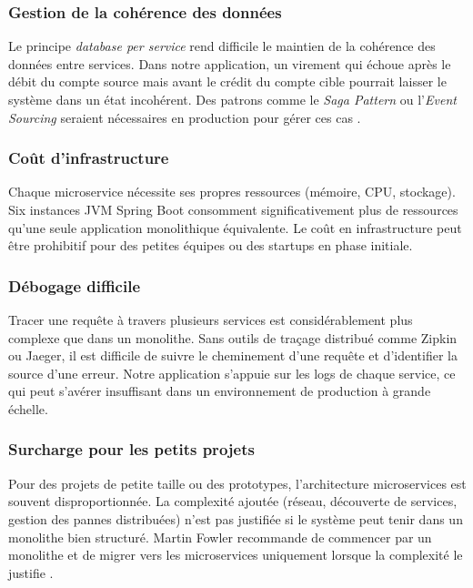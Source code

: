 \documentclass[12pt,a4paper]{article}
\begin{document}
\subsubsection{Gestion de la cohérence des données}

Le principe \textit{database per service} rend difficile le maintien de la cohérence des données entre services. Dans notre application, un virement qui échoue après le débit du compte source mais avant le crédit du compte cible pourrait laisser le système dans un état incohérent. Des patrons comme le \textit{Saga Pattern} ou l'\textit{Event Sourcing} seraient nécessaires en production pour gérer ces cas \cite{richardson2018}.

\subsubsection{Coût d'infrastructure}

Chaque microservice nécessite ses propres ressources (mémoire, CPU, stockage). Six instances JVM Spring Boot consomment significativement plus de ressources qu'une seule application monolithique équivalente. Le coût en infrastructure peut être prohibitif pour des petites équipes ou des startups en phase initiale.

\subsubsection{Débogage difficile}

Tracer une requête à travers plusieurs services est considérablement plus complexe que dans un monolithe. Sans outils de traçage distribué comme Zipkin ou Jaeger, il est difficile de suivre le cheminement d'une requête et d'identifier la source d'une erreur. Notre application s'appuie sur les logs de chaque service, ce qui peut s'avérer insuffisant dans un environnement de production à grande échelle.

\subsubsection{Surcharge pour les petits projets}

Pour des projets de petite taille ou des prototypes, l'architecture microservices est souvent disproportionnée. La complexité ajoutée (réseau, découverte de services, gestion des pannes distribuées) n'est pas justifiée si le système peut tenir dans un monolithe bien structuré. Martin Fowler recommande de commencer par un monolithe et de migrer vers les microservices uniquement lorsque la complexité le justifie \cite{fowler2015}.
\end{document}
